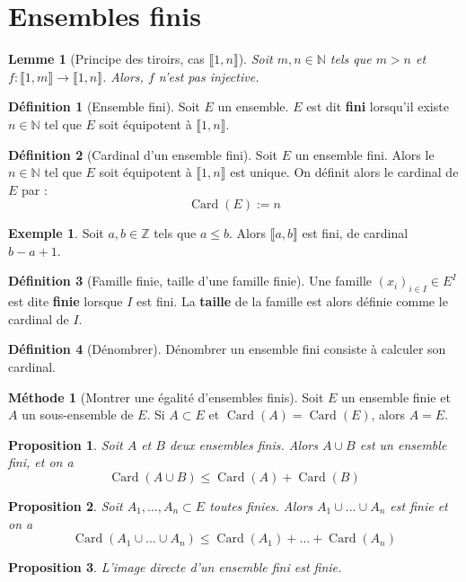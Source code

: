 \documentclass[french]{book}
\newcommand{\N}{\mathbb{N}}
\newcommand{\Z}{\mathbb{Z}}
\theoremstyle{plain}
\newtheorem{lem}{Lemme}[chapter]
\newtheorem{prop}{Proposition}[chapter]
\theoremstyle{definition}
\newtheorem{dfn}{Définition}[chapter]
\newtheorem{exa}{Exemple}[chapter]
\newtheorem{met}{Méthode}[chapter]
\theoremstyle{remark}
\DeclareMathOperator{\card}{Card}
\begin{document}
\section{Ensembles finis}
\begin{lem}[Principe des tiroirs, cas $\llbracket1,n\rrbracket$]
	Soit $m,n\in\N$ tels que $m>n$ et $f:\llbracket1,m\rrbracket\rightarrow\llbracket1,n\rrbracket$. Alors, $f$ n'est pas injective.
\end{lem}
\begin{dfn}[Ensemble fini]
	Soit $E$ un ensemble. $E$ est dit \textbf{fini} lorsqu'il existe $n\in\N$ tel que $E$ soit équipotent à $\llbracket1,n\rrbracket$.
\end{dfn}
\begin{dfn}[Cardinal d'un ensemble fini]
	Soit $E$ un ensemble fini. Alors le $n\in\N$ tel que $E$ soit équipotent à $\llbracket1,n\rrbracket$ est unique. On définit alors le cardinal de $E$ par : $$\card(E):=n$$
\end{dfn}
\begin{exa}
	Soit $a,b\in\Z$ tels que $a\leqslant b$. Alors $\llbracket a,b\rrbracket$ est fini, de cardinal $b-a+1$.
\end{exa}
\begin{dfn}[Famille finie, taille d'une famille finie]
	Une famille $(x_i)_{i\in I}\in E^I$ est dite \textbf{finie} lorsque $I$ est fini. La \textbf{taille} de la famille est alors définie comme le cardinal de $I$.
\end{dfn}
\begin{dfn}[Dénombrer]
	Dénombrer un ensemble fini consiste à calculer son cardinal.
\end{dfn}
\begin{met}[Montrer une égalité d'ensembles finis]
	Soit $E$ un ensemble finie et $A$ un sous-ensemble de $E$. Si $A\subset E$ et $\card(A)=\card(E)$, alors $A=E$.
\end{met}
\begin{prop}
	Soit $A$ et $B$ deux ensembles finis. Alors $A\cup B$ est un ensemble fini, et on a $$\card(A\cup B)\leqslant\card(A)+\card(B)$$
\end{prop}
\begin{prop}
	Soit $A_1,\ldots,A_n\subset E$ toutes finies. Alors $A_1\cup\ldots\cup A_n$ est finie et on a $$\card(A_1\cup\ldots\cup A_n)\leqslant\card(A_1)+\ldots+\card(A_n)$$
\end{prop}
\begin{prop}
	L'image directe d'un ensemble fini est finie.
\end{prop}
\end{document}
